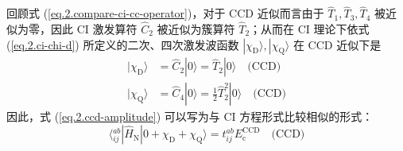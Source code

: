 回顾式 (\ref{eq.2.compare-ci-cc-operator})，对于 CCD 近似而言由于 $\hat T_1, \hat T_3, \hat T_4$ 被近似为零，因此 CI 激发算符 $\hat C_2$ 被近似为簇算符 $\hat T_2$；从而在 CI 理论下依式 (\ref{eq.2.ci-chi-d}) 所定义的二次、四次激发波函数 $| \chi_\mathrm{D} \rangle, | \chi_\mathrm{Q} \rangle$ 在 CCD 近似下是
\begin{align}
  | \chi_\mathrm{D} \rangle &= \hat C_2 | 0 \rangle = \hat T_2 | 0 \rangle \quad \text{(CCD)} \\
  | \chi_\mathrm{Q} \rangle &= \hat C_4 | 0 \rangle = \frac{1}{2} \hat T_2^2 | 0 \rangle \quad \text{(CCD)}
\end{align}
因此，式 (\ref{eq.2.ccd-amplitude}) 可以写为与 CI 方程形式比较相似的形式：
\begin{equation}
  \label{eq.2.ccd-amplitude-by-ci}
  \langle {}_{ij}^{ab} | \hat H_\mathrm{N} | 0 + \chi_\mathrm{D} + \chi_\mathrm{Q} \rangle = t_{ij}^{ab} E_\mathrm{c}^\mathrm{CCD} \quad \text{(CCD)}
\end{equation}

